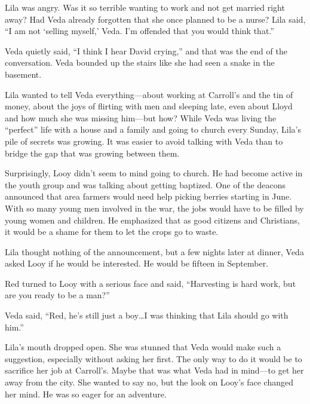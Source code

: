 \documentclass[
  american,
  letterpaper,
]{book}
\begin{document}
Lila was angry. Was it so terrible wanting to work and not get married
right away? Had Veda already forgotten that she once planned to be a
nurse? Lila said, ``I am not `selling myself,' Veda. I'm offended that
you would think that.''

Veda quietly said, ``I think I hear David crying,'' and that was the end
of the conversation. Veda bounded up the stairs like she had seen a
snake in the basement.

Lila wanted to tell Veda everything---about working at Carroll's and the
tin of money, about the joys of flirting with men and sleeping late,
even about Lloyd and how much she was missing him---but how? While Veda
was living the ``perfect'' life with a house and a family and going to
church every Sunday, Lila's pile of secrets was growing. It was easier
to avoid talking with Veda than to bridge the gap that was growing
between them.

Surprisingly, Looy didn't seem to mind going to church. He had become
active in the youth group and was talking about getting baptized. One of
the deacons announced that area farmers would need help picking berries
starting in June. With so many young men involved in the war, the jobs
would have to be filled by young women and children. He emphasized that
as good citizens and Christians, it would be a shame for them to let the
crops go to waste.

Lila thought nothing of the announcement, but a few nights later at
dinner, Veda asked Looy if he would be interested. He would be fifteen
in September.

Red turned to Looy with a serious face and said, ``Harvesting is hard
work, but are you ready to be a man?''

Veda said, ``Red, he's still just a boy\ldots I was thinking that Lila
should go with him.''

Lila's mouth dropped open. She was stunned that Veda would make such a
suggestion, especially without asking her first. The only way to do it
would be to sacrifice her job at Carroll's. Maybe that was what Veda had
in mind---to get her away from the city. She wanted to say no, but the
look on Looy's face changed her mind. He was so eager for an adventure.
\end{document}
